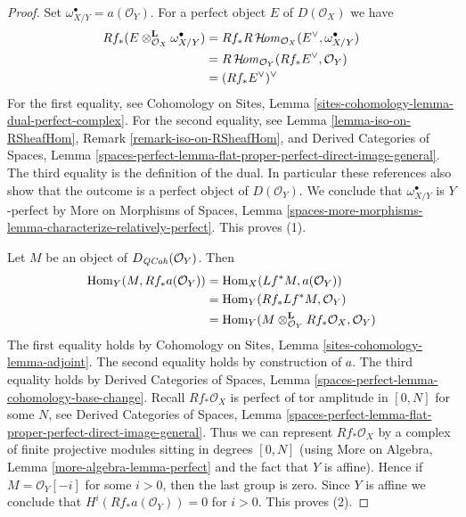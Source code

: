 \begin{proof}
Set $\omega_{X/Y}^\bullet = a(\mathcal{O}_Y)$.
For a perfect object $E$ of $D(\mathcal{O}_X)$ we have
\begin{align*}
Rf_*(E \otimes_{\mathcal{O}_X}^\mathbf{L} \omega_{X/Y}^\bullet)
& =
Rf_*R\mathop{\mathcal{H}\!\mathit{om}}\nolimits_{\mathcal{O}_X}(E^\vee, \omega_{X/Y}^\bullet) \\
& =
R\mathop{\mathcal{H}\!\mathit{om}}\nolimits_{\mathcal{O}_Y}(Rf_*E^\vee, \mathcal{O}_Y) \\
& =
(Rf_*E^\vee)^\vee
\end{align*}
For the first equality, see
Cohomology on Sites, Lemma \ref{sites-cohomology-lemma-dual-perfect-complex}.
For the second equality, see Lemma \ref{lemma-iso-on-RSheafHom},
Remark \ref{remark-iso-on-RSheafHom}, and 
Derived Categories of Spaces, Lemma
\ref{spaces-perfect-lemma-flat-proper-perfect-direct-image-general}.
The third equality is the definition of the dual. In particular
these references also show that the outcome is a perfect object
of $D(\mathcal{O}_Y)$. We conclude that $\omega_{X/Y}^\bullet$
is $Y$-perfect by More on Morphisms of Spaces, Lemma
\ref{spaces-more-morphisms-lemma-characterize-relatively-perfect}.
This proves (1).

\medskip\noindent
Let $M$ be an object of $D_{\mathit{QCoh}}(\mathcal{O}_Y)$. Then
\begin{align*}
\mathop{\mathrm{Hom}}\nolimits_Y(M, Rf_*a(\mathcal{O}_Y)) & =
\mathop{\mathrm{Hom}}\nolimits_X(Lf^*M, a(\mathcal{O}_Y)) \\
& =
\mathop{\mathrm{Hom}}\nolimits_Y(Rf_*Lf^*M, \mathcal{O}_Y) \\
& =
\mathop{\mathrm{Hom}}\nolimits_Y(M \otimes_{\mathcal{O}_Y}^\mathbf{L} Rf_*\mathcal{O}_X, \mathcal{O}_Y)
\end{align*}
The first equality holds by Cohomology on Sites, Lemma
\ref{sites-cohomology-lemma-adjoint}.
The second equality holds by construction of $a$.
The third equality holds by Derived Categories of Spaces, Lemma
\ref{spaces-perfect-lemma-cohomology-base-change}.
Recall $Rf_*\mathcal{O}_X$ is perfect of tor amplitude in $[0, N]$
for some $N$, see
Derived Categories of Spaces, Lemma
\ref{spaces-perfect-lemma-flat-proper-perfect-direct-image-general}.
Thus we can represent $Rf_*\mathcal{O}_X$ by a complex of
finite projective modules sitting in degrees $[0, N]$
(using More on Algebra, Lemma \ref{more-algebra-lemma-perfect}
and the fact that $Y$ is affine).
Hence if $M = \mathcal{O}_Y[-i]$ for some $i > 0$, then the last
group is zero. Since $Y$ is affine we conclude that
$H^i(Rf_*a(\mathcal{O}_Y)) = 0$ for $i > 0$.
This proves (2).


\end{proof}
